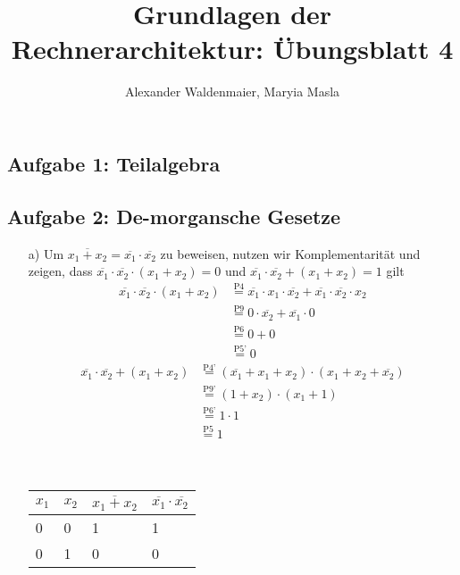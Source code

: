 \documentclass{article}
\title{Grundlagen der Rechnerarchitektur: Übungsblatt 4}
\author{Alexander Waldenmaier, Maryia Masla}
\begin{document}
    \maketitle

    \subsection*{Aufgabe 1: Teilalgebra}
    
    
    \subsection*{Aufgabe 2: De-morgansche Gesetze}
    \begin{itemize}
    	\item[a)]Um $\overline{x_1 + x_2} = \overline{x_1} \cdot \overline{x_2}$ zu beweisen, nutzen wir Komplementarität und zeigen, dass $\overline{x_1} \cdot \overline{x_2} \cdot (x_1 + x_2) = 0$ und $\overline{x_1} \cdot \overline{x_2} + (x_1 + x_2) = 1$ gilt\\
    	\begin{align*}
    		\overline{x_1} \cdot \overline{x_2} \cdot (x_1 + x_2) & \stackrel{\text{P4}}{=} \overline{x_1} \cdot x_1 \cdot \overline{x_2} + \overline{x_1} \cdot \overline{x_2} \cdot x_2 \\
    		& \stackrel{\text{P9}}{=} 0 \cdot \overline{x_2} + \overline{x_1} \cdot 0 \\
    		& \stackrel{\text{P6}}{=} 0 + 0 \\
    		& \stackrel{\text{P5'}}{=} 0
    	\end{align*}
    	\begin{align*}
    		\overline{x_1} \cdot \overline{x_2} + (x_1 + x_2) & \stackrel{\text{P4'}}{=} (\overline{x_1} + x_1 + x_2) \cdot (x_1 + x_2 + \overline{x_2}) \\
    		& \stackrel{\text{P9'}}{=} (1 + x_2) \cdot (x_1 + 1) \\
    		& \stackrel{\text{P6'}}{=} 1 \cdot 1 \\
    		& \stackrel{\text{P5}}{=} 1
    	\end{align*}\\\\
    	\begin{tabular}{l|l|l|l}
    		$x_1$ & $x_2$ & $\overline{x_1 + x_2}$ & $\overline{x_1} \cdot \overline{x_2}$ \\
    		\hline
    		0&0&1&1 \\
    		0&1&0&0 \\

\end{tabular}
\end{itemize}
\end{document}
